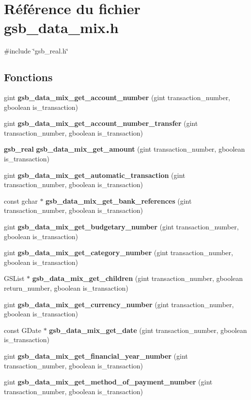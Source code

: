 \section{Référence du fichier gsb\_\-data\_\-mix.h}
\label{gsb__data__mix_8h}
{\ttfamily \#include \char`\"{}gsb\_\-real.h\char`\"{}}\par
\subsection*{Fonctions}
\begin{DoxyCompactItemize}
\item 
gint {\bf gsb\_\-data\_\-mix\_\-get\_\-account\_\-number} (gint transaction\_\-number, gboolean is\_\-transaction)
\item 
gint {\bf gsb\_\-data\_\-mix\_\-get\_\-account\_\-number\_\-transfer} (gint transaction\_\-number, gboolean is\_\-transaction)
\item 
{\bf gsb\_\-real} {\bf gsb\_\-data\_\-mix\_\-get\_\-amount} (gint transaction\_\-number, gboolean is\_\-transaction)
\item 
gint {\bf gsb\_\-data\_\-mix\_\-get\_\-automatic\_\-transaction} (gint transaction\_\-number, gboolean is\_\-transaction)
\item 
const gchar $\ast$ {\bf gsb\_\-data\_\-mix\_\-get\_\-bank\_\-references} (gint transaction\_\-number, gboolean is\_\-transaction)
\item 
gint {\bf gsb\_\-data\_\-mix\_\-get\_\-budgetary\_\-number} (gint transaction\_\-number, gboolean is\_\-transaction)
\item 
gint {\bf gsb\_\-data\_\-mix\_\-get\_\-category\_\-number} (gint transaction\_\-number, gboolean is\_\-transaction)
\item 
GSList $\ast$ {\bf gsb\_\-data\_\-mix\_\-get\_\-children} (gint transaction\_\-number, gboolean return\_\-number, gboolean is\_\-transaction)
\item 
gint {\bf gsb\_\-data\_\-mix\_\-get\_\-currency\_\-number} (gint transaction\_\-number, gboolean is\_\-transaction)
\item 
const GDate $\ast$ {\bf gsb\_\-data\_\-mix\_\-get\_\-date} (gint transaction\_\-number, gboolean is\_\-transaction)
\item 
gint {\bf gsb\_\-data\_\-mix\_\-get\_\-financial\_\-year\_\-number} (gint transaction\_\-number, gboolean is\_\-transaction)
\item 
gint {\bf gsb\_\-data\_\-mix\_\-get\_\-method\_\-of\_\-payment\_\-number} (gint transaction\_\-number, gboolean is\_\-transaction)

\end{DoxyCompactItemize}

